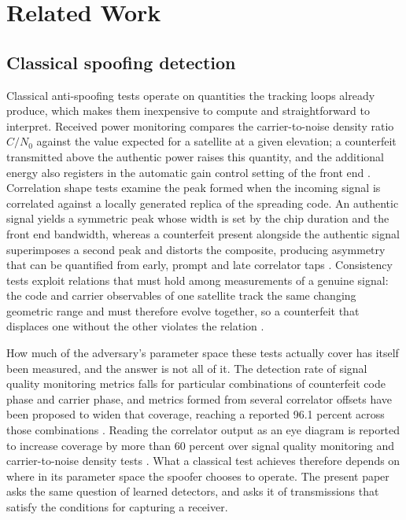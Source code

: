 \section{Related Work}
\label{sec:related}

\subsection{Classical spoofing detection}
\label{sec:rw_classical}

Classical anti-spoofing tests operate on quantities the tracking loops already produce,
which makes them inexpensive to compute and straightforward to interpret. Received power
monitoring compares the carrier-to-noise density ratio $C/N_0$ against the value expected
for a satellite at a given elevation; a counterfeit transmitted above the authentic power
raises this quantity, and the additional energy also registers in the automatic gain
control setting of the front end \citep{akos2012gnss}. Correlation shape tests examine the
peak formed when the incoming signal is correlated against a locally generated replica of
the spreading code. An authentic signal yields a symmetric peak whose width is set by the
chip duration and the front end bandwidth, whereas a counterfeit present alongside the
authentic signal superimposes a second peak and distorts the composite, producing
asymmetry that can be quantified from early, prompt and late correlator taps
\citep{psiaki2016gnss}. Consistency tests exploit relations that must hold among
measurements of a genuine signal: the code and carrier observables of one satellite track
the same changing geometric range and must therefore evolve together, so a counterfeit
that displaces one without the other violates the relation \citep{psiaki2016gnss}.

How much of the adversary's parameter space these tests actually cover has itself been
measured, and the answer is not all of it. The detection rate of signal quality monitoring
metrics falls for particular combinations of counterfeit code phase and carrier phase, and
metrics formed from several correlator offsets have been proposed to widen that coverage,
reaching a reported 96.1 percent across those combinations \citep{wu2025musd}. Reading the
correlator output as an eye diagram is reported to increase coverage by more than 60
percent over signal quality monitoring and carrier-to-noise density tests
\citep{wu2025eyediagram}. What a classical test achieves therefore depends on where in its
parameter space the spoofer chooses to operate. The present paper asks the same question of
learned detectors, and asks it of transmissions that satisfy the conditions for capturing a
receiver.

